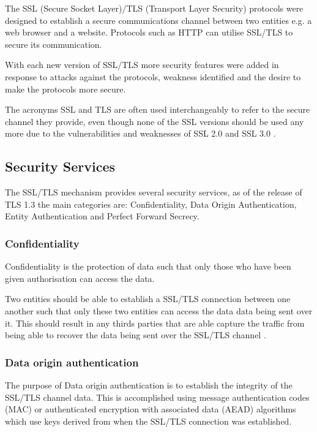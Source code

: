 \documentclass{mscreport}
\begin{document}
\noindent The SSL (Secure Socket Layer)/TLS (Transport Layer Security) protocols were designed to establish a secure communications channel between two entities e.g. a web browser and a website. Protocols such as HTTP can utilise SSL/TLS to secure its communication.

\vspace{0.3cm}
\noindent With each new version of SSL/TLS more security features were added in response to attacks against the protocols, weakness identified and the desire to make the protocols more secure.

\vspace{0.3cm}
\noindent The acronyms SSL and TLS are often used interchangeably to refer to the secure channel they provide, even though none of the SSL versions should be used any more due to the vulnerabilities and weaknesses of SSL 2.0 and SSL 3.0 \cite{Oppliger2016-ig}.

\subsection{Security Services}
\noindent The SSL/TLS mechanism provides several security services, as of the release of TLS 1.3 the main categories are: Confidentiality, Data Origin Authentication, Entity Authentication and Perfect Forward Secrecy.

\subsubsection{Confidentiality}

Confidentiality is the protection of data such that only those who have been given authorisation can access the data.

\vspace{0.3cm} \noindent
Two entities should be able to establish a SSL/TLS connection between one another such that only these two entities can access the data data being sent over it. This should result in any thirds parties that are able capture the traffic from being able to recover the data being sent over the SSL/TLS channel \cite{Martin2017-sx}.

\subsubsection{Data origin authentication}

The purpose of Data origin authentication is to establish the integrity of the SSL/TLS channel data. This is accomplished using message authentication codes (MAC)  or authenticated encryption with associated data (AEAD) algorithms \cite{Ristic2017-aj} which use keys derived from when the SSL/TLS connection was established.
\end{document}
